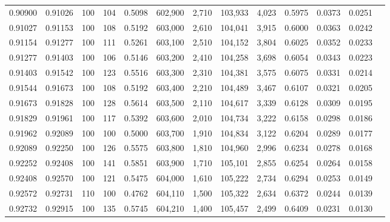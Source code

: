 \begin{tabular}{rrrrrrrrrrrrr}
0.90900 & 0.91026 &   100 & 104 &                                     0.5098 & 602,900 &   2,710 & 103,933 &   4,023 & 0.5975 & 0.0373 & 0.0251 \\
0.91027 & 0.91153 &   100 & 108 &                                     0.5192 & 603,000 &   2,610 & 104,041 &   3,915 & 0.6000 & 0.0363 & 0.0242 \\
0.91154 & 0.91277 &   100 & 111 &                                     0.5261 & 603,100 &   2,510 & 104,152 &   3,804 & 0.6025 & 0.0352 & 0.0233 \\
0.91277 & 0.91403 &   100 & 106 &                                     0.5146 & 603,200 &   2,410 & 104,258 &   3,698 & 0.6054 & 0.0343 & 0.0223 \\
0.91403 & 0.91542 &   100 & 123 &                                     0.5516 & 603,300 &   2,310 & 104,381 &   3,575 & 0.6075 & 0.0331 & 0.0214 \\
0.91544 & 0.91673 &   100 & 108 &                                     0.5192 & 603,400 &   2,210 & 104,489 &   3,467 & 0.6107 & 0.0321 & 0.0205 \\
0.91673 & 0.91828 &   100 & 128 &                                     0.5614 & 603,500 &   2,110 & 104,617 &   3,339 & 0.6128 & 0.0309 & 0.0195 \\
0.91829 & 0.91961 &   100 & 117 &                                     0.5392 & 603,600 &   2,010 & 104,734 &   3,222 & 0.6158 & 0.0298 & 0.0186 \\
0.91962 & 0.92089 &   100 & 100 &                                     0.5000 & 603,700 &   1,910 & 104,834 &   3,122 & 0.6204 & 0.0289 & 0.0177 \\
0.92089 & 0.92250 &   100 & 126 &                                     0.5575 & 603,800 &   1,810 & 104,960 &   2,996 & 0.6234 & 0.0278 & 0.0168 \\
0.92252 & 0.92408 &   100 & 141 &                                     0.5851 & 603,900 &   1,710 & 105,101 &   2,855 & 0.6254 & 0.0264 & 0.0158 \\
0.92408 & 0.92570 &   100 & 121 &                                     0.5475 & 604,000 &   1,610 & 105,222 &   2,734 & 0.6294 & 0.0253 & 0.0149 \\
0.92572 & 0.92731 &   110 & 100 &                                     0.4762 & 604,110 &   1,500 & 105,322 &   2,634 & 0.6372 & 0.0244 & 0.0139 \\
0.92732 & 0.92915 &   100 & 135 &                                     0.5745 & 604,210 &   1,400 & 105,457 &   2,499 & 0.6409 & 0.0231 & 0.0130 \\

\end{tabular}
